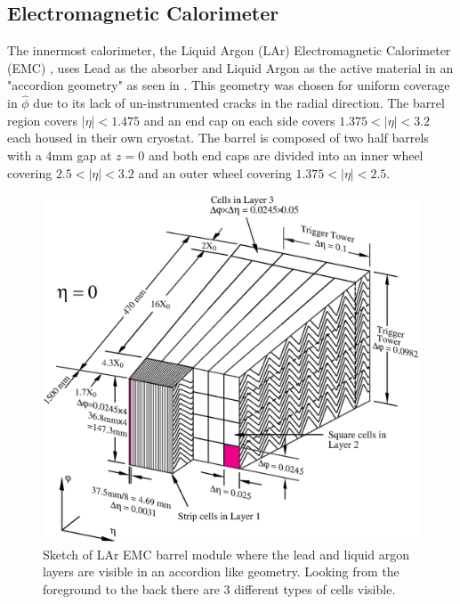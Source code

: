 \subsection{Electromagnetic Calorimeter}

The innermost calorimeter, the Liquid Argon (LAr) Electromagnetic Calorimeter
(EMC) \cite{PERF-2007-01}, uses Lead as the absorber and Liquid Argon as the
active material in an "accordion geometry" as seen in .
This geometry was chosen for uniform coverage in $\hat{\phi}$ due to its lack
of un-instrumented cracks in the radial direction.  The barrel region covers
$|\eta| < 1.475$ and an end cap on each side covers $1.375 < |\eta| < 3.2$ each
housed in their own cryostat.  The barrel is composed of two half barrels with
a 4mm gap at $z = 0$ and both end caps are divided into an inner wheel
covering $2.5 < |\eta| < 3.2$ and an outer wheel covering $1.375 < |\eta| <
2.5$.

\begin{figure}[!htbp]
  \begin{center}
    \includegraphics[width=0.8\linewidth]{figures/atlas/accordion}
    \caption{ \cite{PERF-2007-01} Sketch of LAr EMC barrel module where the lead
and liquid argon layers are visible in an accordion like geometry. Looking from
the foreground to the back there are 3 different types of cells visible.}
    \label{fig:accordion}
  \end{center}
\end{figure}

